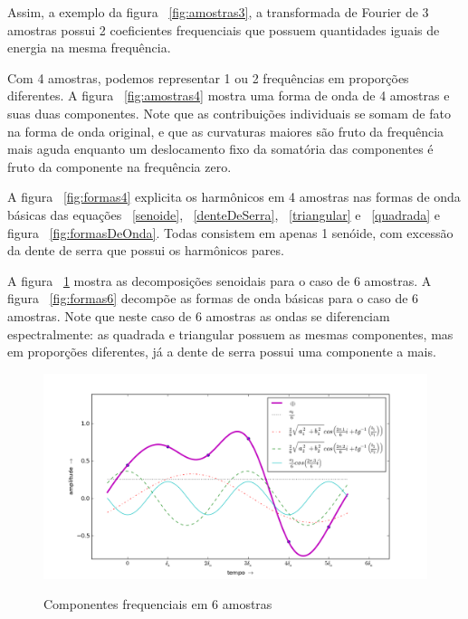 Assim, a exemplo da figura ~\ref{fig:amostras3}, a transformada de Fourier de 3 amostras possui 2 coeficientes frequenciais que possuem quantidades iguais de energia na mesma frequência.

Com 4 amostras, podemos representar 1 ou 2 frequências em proporções diferentes. A figura ~\ref{fig:amostras4} mostra uma 
forma de onda de 4 amostras e suas duas componentes. 
Note que as contribuições individuais se somam de fato na forma de onda 
original, e que as curvaturas maiores são fruto da frequência mais aguda
enquanto um deslocamento fixo da somatória das componentes é fruto
da componente na frequência zero.

A figura ~\ref{fig:formas4} explicita os harmônicos em 4 amostras nas formas de onda básicas das equações ~\ref{senoide}, ~\ref{denteDeSerra}, ~\ref{triangular} e ~\ref{quadrada} e figura ~\ref{fig:formasDeOnda}. Todas consistem em apenas 1 senóide, com excessão da dente de serra que possui os harmônicos pares.


A figura ~\ref{fig:amostras6} mostra as decomposições senoidais para o caso de 6 amostras. A figura ~\ref{fig:formas6} decompõe as formas de onda básicas para o caso de 6 amostras.
 Note que neste caso de 6 amostras as ondas se diferenciam espectralmente: as quadrada e triangular possuem as mesmas componentes, mas em proporções diferentes, já a dente de serra possui uma componente a mais.

\begin{figure}[h!]
    \centering
    \caption{Componentes frequenciais em 6 amostras}
        \includegraphics[width=\textwidth]{figuras/amostras6}
        \label{fig:amostras6}
\end{figure}

